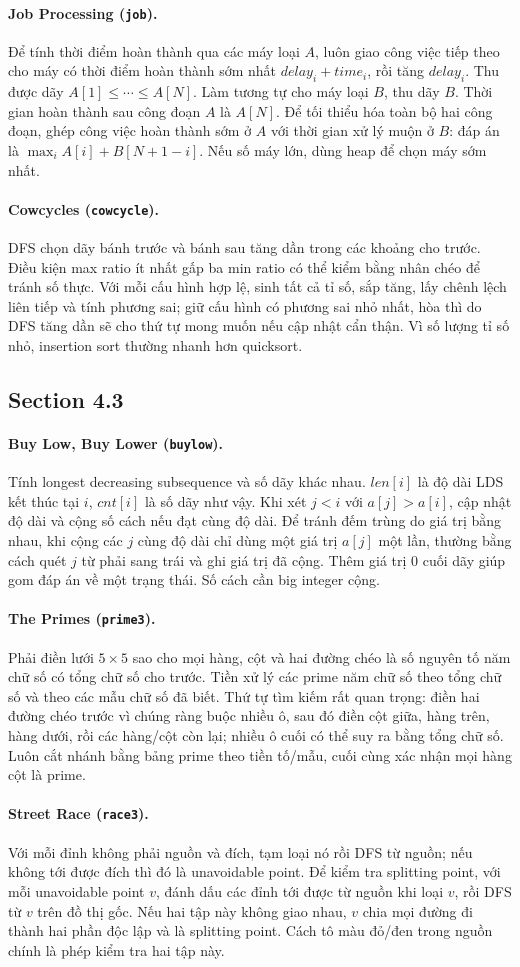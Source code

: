 \documentclass[11pt]{article}
\newcommand{\problem}[2]{\paragraph{#1 (\texttt{#2}).}}
\begin{document}
\problem{Job Processing}{job}
Để tính thời điểm hoàn thành qua các máy loại \(A\), luôn giao công việc tiếp theo cho máy có thời điểm hoàn thành sớm nhất \(delay_i+time_i\), rồi tăng \(delay_i\). Thu được dãy \(A[1]\le\cdots\le A[N]\). Làm tương tự cho máy loại \(B\), thu dãy \(B\). Thời gian hoàn thành sau công đoạn \(A\) là \(A[N]\). Để tối thiểu hóa toàn bộ hai công đoạn, ghép công việc hoàn thành sớm ở \(A\) với thời gian xử lý muộn ở \(B\): đáp án là \(\max_i A[i]+B[N+1-i]\). Nếu số máy lớn, dùng heap để chọn máy sớm nhất.

\problem{Cowcycles}{cowcycle}
DFS chọn dãy bánh trước và bánh sau tăng dần trong các khoảng cho trước. Điều kiện max ratio ít nhất gấp ba min ratio có thể kiểm bằng nhân chéo để tránh số thực. Với mỗi cấu hình hợp lệ, sinh tất cả tỉ số, sắp tăng, lấy chênh lệch liên tiếp và tính phương sai; giữ cấu hình có phương sai nhỏ nhất, hòa thì do DFS tăng dần sẽ cho thứ tự mong muốn nếu cập nhật cẩn thận. Vì số lượng tỉ số nhỏ, insertion sort thường nhanh hơn quicksort.

\subsection*{Section 4.3}

\problem{Buy Low, Buy Lower}{buylow}
Tính longest decreasing subsequence và số dãy khác nhau. \(len[i]\) là độ dài LDS kết thúc tại \(i\), \(cnt[i]\) là số dãy như vậy. Khi xét \(j<i\) với \(a[j]>a[i]\), cập nhật độ dài và cộng số cách nếu đạt cùng độ dài. Để tránh đếm trùng do giá trị bằng nhau, khi cộng các \(j\) cùng độ dài chỉ dùng một giá trị \(a[j]\) một lần, thường bằng cách quét \(j\) từ phải sang trái và ghi giá trị đã cộng. Thêm giá trị \(0\) cuối dãy giúp gom đáp án về một trạng thái. Số cách cần big integer cộng.

\problem{The Primes}{prime3}
Phải điền lưới \(5\times5\) sao cho mọi hàng, cột và hai đường chéo là số nguyên tố năm chữ số có tổng chữ số cho trước. Tiền xử lý các prime năm chữ số theo tổng chữ số và theo các mẫu chữ số đã biết. Thứ tự tìm kiếm rất quan trọng: điền hai đường chéo trước vì chúng ràng buộc nhiều ô, sau đó điền cột giữa, hàng trên, hàng dưới, rồi các hàng/cột còn lại; nhiều ô cuối có thể suy ra bằng tổng chữ số. Luôn cắt nhánh bằng bảng prime theo tiền tố/mẫu, cuối cùng xác nhận mọi hàng cột là prime.

\problem{Street Race}{race3}
Với mỗi đỉnh không phải nguồn và đích, tạm loại nó rồi DFS từ nguồn; nếu không tới được đích thì đó là unavoidable point. Để kiểm tra splitting point, với mỗi unavoidable point \(v\), đánh dấu các đỉnh tới được từ nguồn khi loại \(v\), rồi DFS từ \(v\) trên đồ thị gốc. Nếu hai tập này không giao nhau, \(v\) chia mọi đường đi thành hai phần độc lập và là splitting point. Cách tô màu đỏ/đen trong nguồn chính là phép kiểm tra hai tập này.
\end{document}
